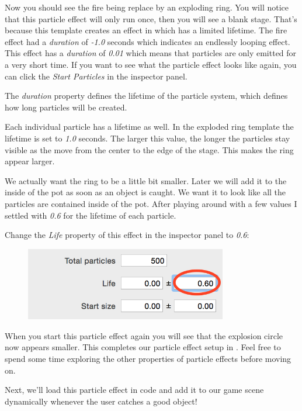 Now you should see the fire being replace by an exploding ring. You will notice
that this particle effect will only run once, then you will see a blank stage.
That's because this template creates an effect in which has a limited lifetime.
The fire effect had a \textit{duration} of \textit{-1.0} seconds which indicates
an endlessly looping effect. This effect has a \textit{duration} of \textit{0.01}
which means that particles are only emitted for a very short time. If you
want to see what the particle effect looks like again, you can click the
\textit{Start Particles} in the inspector panel. 

The \textit{duration} property defines the lifetime of the particle system,
which defines how long particles will be created.

Each individual particle has a lifetime as well. In the exploded ring template
the lifetime is set to \textit{1.0} seconds. The larger this value, the longer
the particles stay visible as the move from the center to the edge of the stage.
This makes the ring appear larger. 

We actually want the ring to be a little bit smaller. Later we will add it to
the inside of the pot as soon as an object is caught. We want it to look like
all the particles are contained inside of the pot. After playing around with a
few values I settled with \textit{0.6} for the lifetime of each particle.

\begin{leftbar}
Change the \textit{Life} property of this effect in the inspector
panel to \textit{0.6}:
\begin{figure}[H]
  \centering
  \includegraphics[width=250pt]{images/Chapter9/change_lifetime.png}
\end{figure}
\end{leftbar}

When you start this particle effect again you will see that the explosion circle
now appears smaller. This completes our particle effect setup in \SB{}. Feel
free to spend some time exploring the other properties of particle effects
before moving on.

Next, we'll load this particle effect in code and add it to our game scene
dynamically whenever the user catches a good object!

